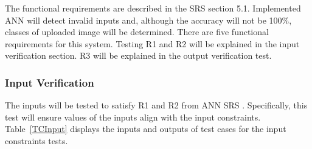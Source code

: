 \documentclass[12pt, titlepage]{article}
\begin{document}
The functional requirements are described in the 
SRS \citep{SRS} section 5.1. 
Implemented ANN will detect invalid inputs and, although the accuracy will not be 100\%,
classes of uploaded image will be determined. There are five functional requirements for
this system. Testing R1 and R2 will be explained in 
the input verification section. R3 will be
explained in the output verification test.



\subsubsection{Input Verification} \label{InputVerification}

The inputs will be tested to satisfy R1 and R2 from ANN 
SRS \citep{SRS}. Specifically,
this test will ensure values of the inputs align with the input constraints.
Table~\ref{TCInput} displays the inputs and outputs of test cases for the input constraints
tests.
		
\end{document}
